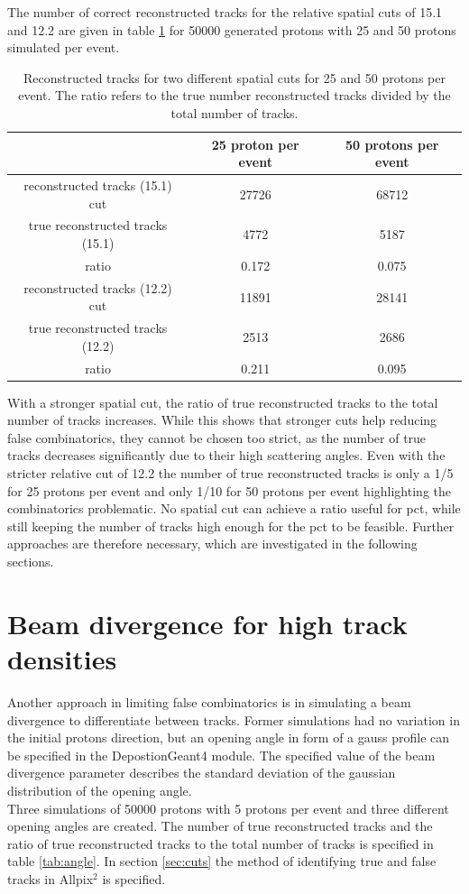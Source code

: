 The number of correct reconstructed tracks for the relative spatial cuts of 15.1 and 12.2 are given in table
\ref{tab:true_tracks} for 50000 generated protons with
25 and 50 protons simulated per event.


\begin{table}
  \centering
  \begin{tabular}{c | c c}
    \toprule
     &  25 proton per event & 50 protons per event\\
    \midrule
    reconstructed tracks (15.1) cut & 27726 & 68712  \\
    true reconstructed tracks (15.1) & 4772  & 5187 \\
    ratio & 0.172 & 0.075 \\
    \midrule
    reconstructed tracks (12.2) cut & 11891 & 28141 \\
    true reconstructed tracks (12.2) & 2513  & 2686 \\
    ratio & 0.211 & 0.095

  \end{tabular}
  \caption{Reconstructed tracks for two different spatial cuts for 25 and 50 protons per event. The ratio refers to the true
  number reconstructed tracks divided by the total number of tracks.}
  \label{tab:true_tracks}
\end{table}

With a stronger spatial cut,  the ratio of true reconstructed tracks to
the total number of tracks increases. While this shows that stronger cuts help reducing false combinatorics, they cannot be chosen too strict,
as the number of true tracks decreases significantly due to their high scattering angles. Even with the stricter relative cut of 12.2 the
number of true reconstructed tracks is only a 1/5 for 25 protons per event and only 1/10 for 50 protons per event highlighting
the combinatorics problematic. No spatial cut can achieve a ratio useful for pct, while still keeping the number
of tracks high enough for the pct to be feasible. Further approaches are therefore necessary, which are investigated in the following sections.

\section{Beam divergence for high track densities}
Another approach in limiting false combinatorics is in simulating a beam divergence to differentiate between tracks. Former simulations had no variation
in the initial protons direction, but an opening angle in form of a gauss profile can be specified in the DepostionGeant4 module. The specified value of
the beam divergence parameter describes the standard deviation of the gaussian distribution of the opening angle.  \\
Three simulations of 50000 protons with 5 protons per event and three different opening angles are created. The number of true reconstructed tracks and the ratio
of true reconstructed tracks to the total number of tracks is specified in table \ref{tab:angle}. In section \ref{sec:cuts} the method of identifying
true and false tracks in Allpix$^2$ is specified.

